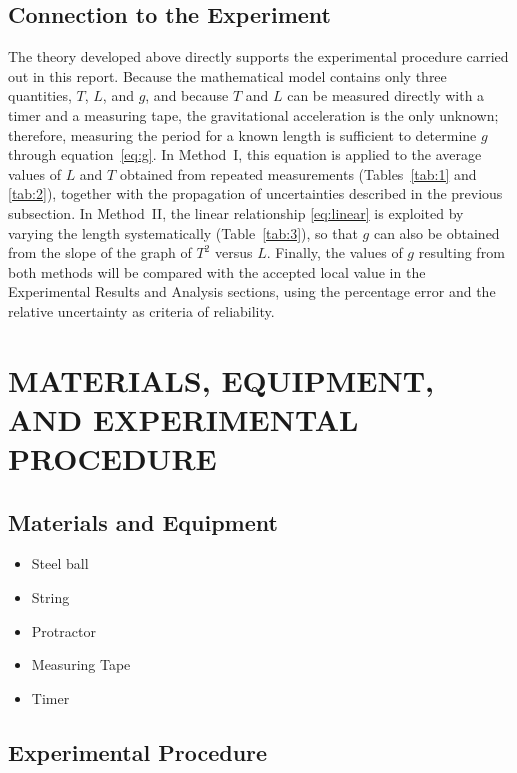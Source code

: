 \documentclass[11pt,a4paper]{article}
\begin{document}
\subsection{Connection to the Experiment}
The theory developed above directly supports the experimental procedure
carried out in this report. Because the mathematical model contains only
three quantities, $T$, $L$, and $g$, and because $T$ and $L$ can be
measured directly with a timer and a measuring tape, the gravitational
acceleration is the only unknown; therefore, measuring the period for a
known length is sufficient to determine $g$ through
equation~\eqref{eq:g}. In Method~I, this equation is applied to the
average values of $L$ and $T$ obtained from repeated measurements
(Tables~\ref{tab:1} and \ref{tab:2}), together with the propagation of
uncertainties described in the previous subsection. In Method~II, the
linear relationship \eqref{eq:linear} is exploited by varying the length
systematically (Table~\ref{tab:3}), so that $g$ can also be obtained from
the slope of the graph of $T^{2}$ versus $L$. Finally, the values of $g$
resulting from both methods will be compared with the accepted local value
in the Experimental Results and Analysis sections, using the percentage
error and the relative uncertainty as criteria of reliability.

\section{MATERIALS, EQUIPMENT, AND EXPERIMENTAL PROCEDURE}

\subsection{Materials and Equipment}
\begin{itemize}
  \item Steel ball
  \item String
  \item Protractor
  \item Measuring Tape
  \item Timer
\end{itemize}

\subsection{Experimental Procedure}
\end{document}
